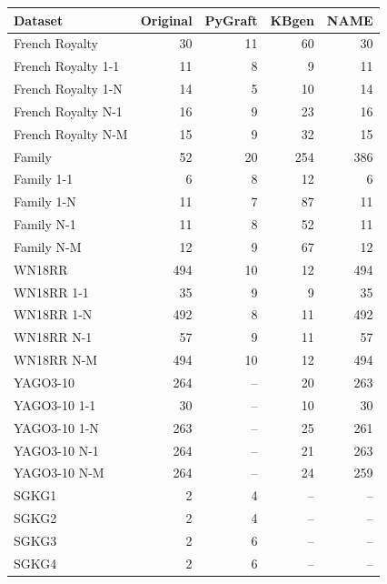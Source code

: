 \begin{tabular}{lrrrr}
\toprule
Dataset & Original & PyGraft & KBgen & NAME \\
\midrule
French Royalty & 30 & 11 & 60 & 30 \\
French Royalty 1-1 & 11 & 8 & 9 & 11 \\
French Royalty 1-N & 14 & 5 & 10 & 14 \\
French Royalty N-1 & 16 & 9 & 23 & 16 \\
French Royalty N-M & 15 & 9 & 32 & 15 \\
\midrule
Family & 52 & 20 & 254 & 386 \\
Family 1-1 & 6 & 8 & 12 & 6 \\
Family 1-N & 11 & 7 & 87 & 11 \\
Family N-1 & 11 & 8 & 52 & 11 \\
Family N-M & 12 & 9 & 67 & 12 \\
\midrule
WN18RR & 494 & 10 & 12 & 494 \\
WN18RR 1-1 & 35 & 9 & 9 & 35 \\
WN18RR 1-N & 492 & 8 & 11 & 492 \\
WN18RR N-1 & 57 & 9 & 11 & 57 \\
WN18RR N-M & 494 & 10 & 12 & 494 \\
\midrule
YAGO3-10 & 264 & – & 20 & 263 \\
YAGO3-10 1-1 & 30 & – & 10 & 30 \\
YAGO3-10 1-N & 263 & – & 25 & 261 \\
YAGO3-10 N-1 & 264 & – & 21 & 263 \\
YAGO3-10 N-M & 264 & – & 24 & 259 \\
\midrule
SGKG1 & 2 & 4 & – & – \\
SGKG2 & 2 & 4 & – & – \\
SGKG3 & 2 & 6 & – & – \\
SGKG4 & 2 & 6 & – & – \\
\bottomrule
\end{tabular}
